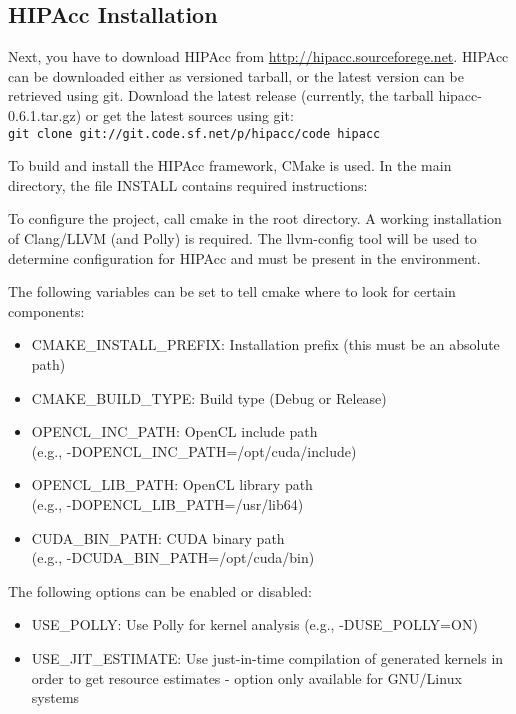 \subsection{\ac{HIPAcc} Installation}
Next, you have to download \ac{HIPAcc} from
\href{http://hipacc.sourceforege.net}{http://hipacc.sourceforege.net}.
\ac{HIPAcc} can be downloaded either as versioned tarball, or the latest version
can be retrieved using git. Download the latest release (currently, the tarball
hipacc-0.6.1.tar.gz) or get the latest sources using git:\\
{\tt git clone git://git.code.sf.net/p/hipacc/code hipacc}

To build and install the \ac{HIPAcc} framework, CMake is used. In the main
directory, the file INSTALL contains required instructions:

To configure the project, call cmake in the root directory. A working
installation of Clang/LLVM (and Polly) is required. The llvm-config tool will be
used to determine configuration for \ac{HIPAcc} and must be present in the
environment.

The following variables can be set to tell cmake where to look for certain components:
\begin{itemize}
    \item CMAKE\_INSTALL\_PREFIX:   Installation prefix (this must be an absolute path)
    \item CMAKE\_BUILD\_TYPE:       Build type (Debug or Release)
    \item OPENCL\_INC\_PATH:        OpenCL include path\\(e.g., -DOPENCL\_INC\_PATH=/opt/cuda/include)
    \item OPENCL\_LIB\_PATH:        OpenCL library path\\(e.g., -DOPENCL\_LIB\_PATH=/usr/lib64)
    \item CUDA\_BIN\_PATH:          CUDA binary path\\(e.g., -DCUDA\_BIN\_PATH=/opt/cuda/bin)
\end{itemize}

The following options can be enabled or disabled:
\begin{itemize}
    \item USE\_POLLY: Use Polly for kernel analysis (e.g., -DUSE\_POLLY=ON)
    \item USE\_JIT\_ESTIMATE: Use just-in-time compilation of generated kernels
    in order to get resource estimates - option only available for GNU/Linux
    systems
\end{itemize}

